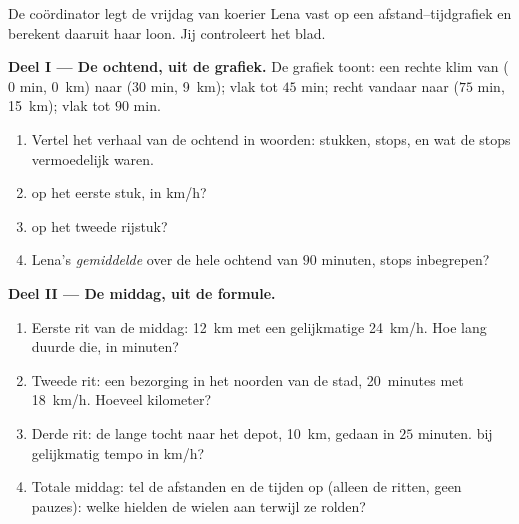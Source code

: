\begin{problem}\label{pb:g7:motion-average-speed:1}
De coördinator legt de vrijdag van koerier Lena vast op een
afstand--tijdgrafiek en berekent daaruit haar loon. Jij controleert het
blad.

\medskip\noindent\textbf{Deel I --- De ochtend, uit de grafiek.}
De grafiek toont: een rechte klim van ($0$ min, \qty{0}{km}) naar
($30$ min, \qty{9}{km}); vlak tot $45$ min; recht vandaar naar
($75$ min, \qty{15}{km}); vlak tot $90$ min.
\begin{enumerate}
  \item Vertel het verhaal van de ochtend in woorden: stukken, stops,
        en wat de stops vermoedelijk waren.
  \item {} op het eerste stuk, in \unit{km/h}?
  \item {} op het tweede rijstuk?
  \item Lena's \emph{gemiddelde}  over de hele ochtend van
        $90$ minuten, stops inbegrepen?
\end{enumerate}

\medskip\noindent\textbf{Deel II --- De middag, uit de formule.}
\begin{enumerate}[resume]
  \item Eerste rit van de middag: \qty{12}{km} met een gelijkmatige
        \qty{24}{km/h}. Hoe lang duurde die, in minuten?
  \item Tweede rit: een bezorging in het noorden van de stad,
        \qty{20}{minutes} met \qty{18}{km/h}. Hoeveel kilometer?
  \item Derde rit: de lange tocht naar het depot, \qty{10}{km},
        gedaan in $25$ minuten.  bij gelijkmatig tempo in
        \unit{km/h}?
  \item Totale middag: tel de afstanden en de tijden op (alleen de
        ritten, geen pauzes): welke  hielden de
        wielen aan terwijl ze rolden?
\end{enumerate}


\end{problem}
